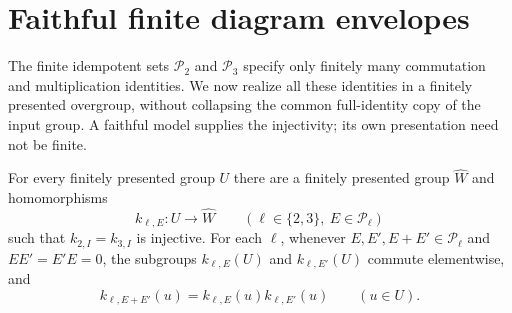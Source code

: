 \section{Faithful finite diagram envelopes}
\label{sec:envelopes}

The finite idempotent sets $\mathcal P_2$ and $\mathcal P_3$ specify
only finitely many commutation and multiplication identities.  We now
realize all these identities in a finitely presented overgroup, without
collapsing the common full-identity copy of the input group.  A faithful
model supplies the injectivity; its own presentation need not be finite.

\begin{proposition}\label{prop:finite-envelope}
For every finitely presented group $U$ there are a finitely presented
group $\widehat W$ and homomorphisms
\[
 k_{\ell,E}:U\longrightarrow\widehat W
 \qquad(\ell\in\{2,3\},\ E\in\mathcal P_\ell)
\]
such that $k_{2,I}=k_{3,I}$ is injective.  For each $\ell$, whenever
$E,E',E+E'\in\mathcal P_\ell$ and $EE'=E'E=0$, the subgroups
$k_{\ell,E}(U)$ and $k_{\ell,E'}(U)$ commute elementwise, and
\[
 k_{\ell,E+E'}(u)=k_{\ell,E}(u)k_{\ell,E'}(u)
 \qquad(u\in U).
\]
\end{proposition}

